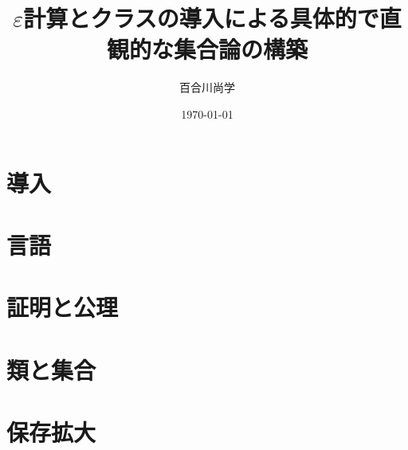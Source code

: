 \documentclass[twocolumn,10pt]{jarticle}
\title{$\varepsilon$計算とクラスの導入による具体的で直観的な集合論の構築}
\author{百合川尚学}
\date{\today}
\begin{document}
\maketitle
\section{導入}
\section{言語}
\section{証明と公理}
\section{類と集合}
\section{保存拡大}
\end{document}
